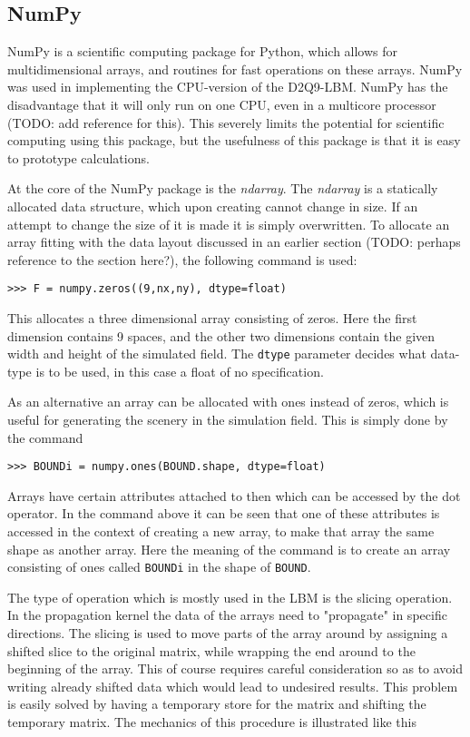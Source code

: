\subsection{NumPy}
NumPy is a scientific computing package for Python, which allows for multidimensional arrays, and routines for fast operations on these arrays. NumPy was used in implementing the CPU-version of the D2Q9-LBM. NumPy has the disadvantage that it will only run on one CPU, even in a multicore processor (TODO: add reference for this). This severely limits the potential for scientific computing using this package, but the usefulness of this package is that it is easy to prototype calculations.

At the core of the NumPy package is the \textit{ndarray}. The \textit{ndarray} is a statically allocated data structure, which upon creating cannot change in size. If an attempt to change the size of it is made it is simply overwritten. To allocate an array fitting with the data layout discussed in an earlier section (TODO: perhaps reference to the section here?), the following command is used:

\begin{verbatim}
>>> F = numpy.zeros((9,nx,ny), dtype=float)
\end{verbatim}

This allocates a three dimensional array consisting of zeros. Here the first dimension contains 9 spaces, and the other two dimensions contain the given width and height of the simulated field. The \texttt{dtype} parameter decides what data-type is to be used, in this case a float of no specification. 

As an alternative an array can be allocated with ones instead of zeros, which is useful for generating the scenery in the simulation field. This is simply done by the command

\begin{verbatim}
>>> BOUNDi = numpy.ones(BOUND.shape, dtype=float)
\end{verbatim}

Arrays have certain attributes attached to then which can be accessed by the dot operator. In the command above it can be seen that one of these attributes is accessed in the context of creating a new array, to make that array the same shape as another array. Here the meaning of the command is to create an array consisting of ones called \texttt{BOUNDi} in the shape of \texttt{BOUND}.

The type of operation which is mostly used in the LBM is the slicing operation. In the propagation kernel the data of the arrays need to "propagate" in specific directions. The slicing is used to move parts of the array around by assigning a shifted slice to the original matrix, while wrapping the end around to the beginning of the array. This of course requires careful consideration so as to avoid writing already shifted data which would lead to undesired results. This problem is easily solved by having a temporary store for the matrix and shifting the temporary matrix. The mechanics of this procedure is illustrated like this

